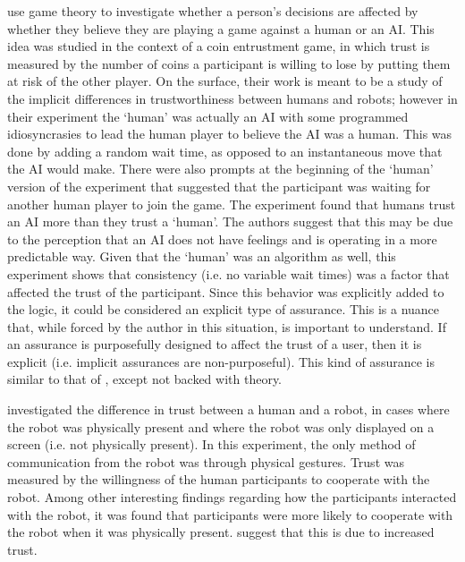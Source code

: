\citet{Wu2016-ei} use game theory to investigate whether a person's decisions are affected by whether they believe they are playing a game against a human or an AI. This idea was studied in the context of a coin entrustment game, in which trust is measured by the number of coins a participant is willing to lose by putting them at risk of the other player. On the surface, their work is meant to be a study of the implicit differences in trustworthiness between humans and robots; however in their experiment the `human' was actually an AI with some programmed idiosyncrasies to lead the human player to believe the AI was a human. This was done by adding a random wait time, as opposed to an instantaneous move that the AI would make. There were also prompts at the beginning of the `human' version of the experiment that suggested that the participant was waiting for another human player to join the game. The experiment found that humans trust an AI more than they trust a `human'. The authors suggest that this may be due to the perception that an AI does not have feelings and is operating in a more predictable way. Given that the `human' was an algorithm as well, this experiment shows that consistency (i.e. no variable wait times) was a factor that affected the trust of the participant. Since this behavior was explicitly added to the logic, it could be considered an explicit type of assurance. This is a nuance that, while forced by the author in this situation, is important to understand. If an assurance is purposefully designed to affect the trust of a user, then it is explicit (i.e. implicit assurances are non-purposeful). This kind of assurance is similar to that of \citeauthor{Dragan2013-wd}, except not backed with theory.

\citet{Bainbridge2011-pl} investigated the difference in trust between a human and a robot, in cases where the robot was physically present and where the robot was only displayed on a screen (i.e. not physically present). In this experiment, the only method of communication from the robot was through physical gestures. Trust was measured by the willingness of the human participants to cooperate with the robot. Among other interesting findings regarding how the participants interacted with the robot, it was found that participants were more likely to cooperate with the robot when it was physically present. \citeauthor{Bainbridge2011-pl} suggest that this is due to increased trust. 

